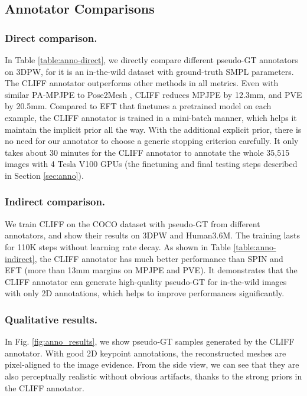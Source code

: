 \documentclass[runningheads]{llncs}
\begin{document}
\subsection{Annotator Comparisons}

\subsubsection{Direct comparison.}
In Table \ref{table:anno-direct}, we directly compare different pseudo-GT annotators on 3DPW, for it is an in-the-wild dataset with ground-truth SMPL parameters.
The CLIFF annotator outperforms other methods in all metrics.
Even with similar PA-MPJPE to Pose2Mesh \cite{choi2020pose2mesh}, CLIFF reduces MPJPE by 12.3mm, and PVE by 20.5mm.
Compared to EFT \cite{joo2021exemplar} that finetunes a pretrained model on each example, the CLIFF annotator is trained in a mini-batch manner, which helps it maintain the implicit prior all the way.
With the additional explicit prior, there is no need for our annotator to choose a generic stopping criterion carefully.
It only takes about 30 minutes for the CLIFF annotator to annotate the whole 35,515 images with 4 Tesla V100 GPUs (the finetuning and final testing steps described in Section \ref{sec:anno}).

\subsubsection{Indirect comparison.}
We train CLIFF on the COCO dataset with pseudo-GT from different annotators, and show their results on 3DPW and Human3.6M.
The training lasts for 110K steps without learning rate decay.
As shown in Table \ref{table:anno-indirect}, the CLIFF annotator has much better performance than SPIN \cite{kolotouros2019learning} and EFT \cite{joo2021exemplar} (more than 13mm margins on MPJPE and PVE).
It demonstrates that the CLIFF annotator can generate high-quality pseudo-GT for in-the-wild images with only 2D annotations, which helps to improve performances significantly.

\subsubsection{Qualitative results.}
In Fig. \ref{fig:anno_results}, we show pseudo-GT samples generated by the CLIFF annotator.
With good 2D keypoint annotations, the reconstructed meshes are pixel-aligned to the image evidence.
From the side view, we can see that they are also perceptually realistic without obvious artifacts, thanks to the strong priors in the CLIFF annotator.
\end{document}
